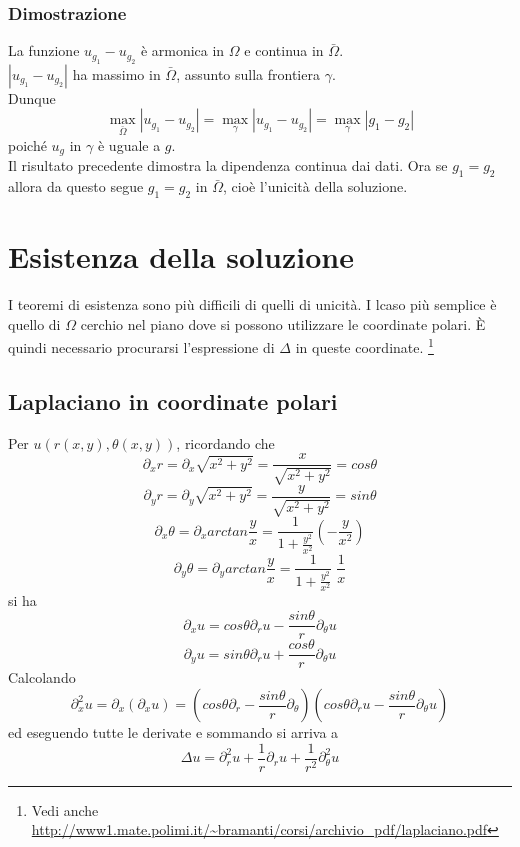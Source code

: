 \subsubsection{Dimostrazione}
La funzione $u_{g_1} - u_{g_2}$ \`e armonica in $\Omega$ e continua in $\bar{\Omega}$.\\
$\left| u_{g_1} - u_{g_2} \right|$ ha massimo in $\bar{\Omega}$, assunto sulla
frontiera $\gamma$. \\ Dunque
\[
	\max_{\bar{\Omega}} \left| u_{g_1} - u_{g_2} \right|=
	\max_{\gamma} \left| u_{g_1} - u_{g_2} \right|=
	\max_{\gamma} \left| g_1 - g_2 \right|
\]
poich\'e $u_g$ in $\gamma$ \`e uguale a $g$.\\
Il risultato precedente dimostra la dipendenza continua dai dati.
Ora se $g_1=g_2$ allora da questo segue $g_1=g_2$ in $\bar{\Omega}$, cio\`e
l'unicit\`a della soluzione.
\section{Esistenza della soluzione}
I teoremi di esistenza sono pi\`u difficili di quelli di unicit\`a.
I lcaso pi\`u semplice \`e quello di $\Omega$ cerchio nel piano dove si 
possono utilizzare le coordinate polari. \`E quindi necessario procurarsi
l'espressione di $\Delta$ in queste coordinate.
\footnote{Vedi anche 
\url{http://www1.mate.polimi.it/~bramanti/corsi/archivio_pdf/laplaciano.pdf}}
\subsection{Laplaciano in coordinate polari}
Per $u(r(x,y), \theta (x,y))$, ricordando che 
\[
	\partial_x r= \partial_x\sqrt{x^2 + y^2}=\frac{x}{\sqrt{x^2 + y^2}}= cos \theta
\]
\[
	\partial_y r= \partial_y\sqrt{x^2 + y^2}=\frac{y}{\sqrt{x^2 + y^2}}= sin \theta
\]
\[
	\partial_x \theta= \partial_x arctan \frac{y}{x}=
	\frac{1}{1 +\frac{y^2}{x^2}} \left( - \frac{y}{x^2} \right)
\]
\[
	\partial_y \theta= \partial_y arctan \frac{y}{x}=
	\frac{1}{1 +\frac{y^2}{x^2}} \; \frac{1}{x}
\]
si ha
\[
	\partial_x u= cos \theta \partial_r u - \frac{sin \theta}{r} \partial_{\theta} u
\]
\[
	\partial_y u= sin \theta \partial_r u + \frac{cos \theta}{r} \partial_{\theta} u
\]
Calcolando 
\[
	\partial_x^2 u = \partial_x(\partial_x u)= 
	\left( cos \theta \partial_r  - \frac{sin \theta}{r} \partial_{\theta} \right)
	\left( cos \theta \partial_r u - \frac{sin \theta}{r} \partial_{\theta} u \right)
\]
ed eseguendo tutte le derivate e sommando si arriva a
\[
	\Delta u = \partial^2_r u + \frac{1}{r} \partial_r u +\frac{1}{r^2}\partial^2_{\theta} u 
\]
